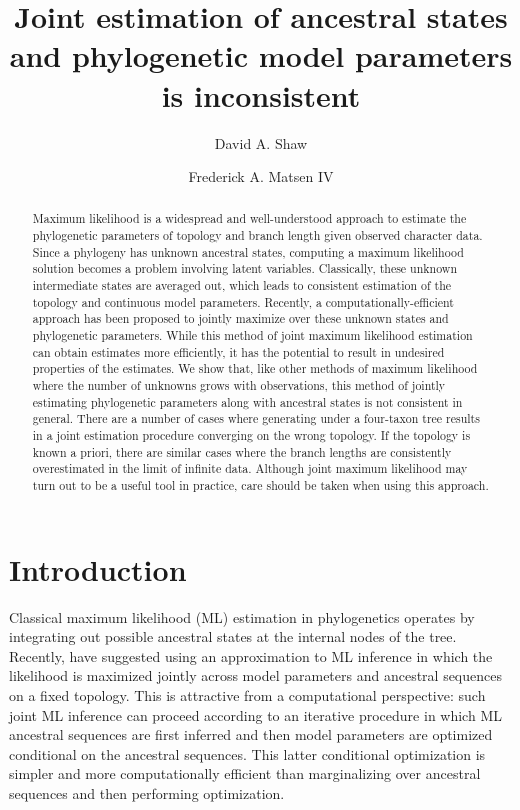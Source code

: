 \documentclass{article}
\title{Joint estimation of ancestral states and phylogenetic model parameters is inconsistent}
\author{David A. Shaw \and Frederick A. Matsen IV}
\begin{document}
\maketitle

\renewcommand{\arraystretch}{1.2} %

\begin{abstract}
Maximum likelihood is a widespread and well-understood approach to estimate the phylogenetic parameters of topology and branch length given observed character data.
Since a phylogeny has unknown ancestral states, computing a maximum likelihood solution becomes a problem involving latent variables.
Classically, these unknown intermediate states are averaged out, which leads to consistent estimation of the topology and continuous model parameters.
Recently, a computationally-efficient approach has been proposed to jointly maximize over these unknown states and phylogenetic parameters.
While this method of joint maximum likelihood estimation can obtain estimates more efficiently, it has the potential to result in undesired properties of the estimates.
We show that, like other methods of maximum likelihood where the number of unknowns grows with observations, this method of jointly estimating phylogenetic parameters along with ancestral states is not consistent in general.
There are a number of cases where generating under a four-taxon tree results in a joint estimation procedure converging on the wrong topology.
If the topology is known a priori, there are similar cases where the branch lengths are consistently overestimated in the limit of infinite data.
Although joint maximum likelihood may turn out to be a useful tool in practice, care should be taken when using this approach.
\end{abstract}

\section*{Introduction}

Classical maximum likelihood (ML) estimation in phylogenetics operates by integrating out possible ancestral states at the internal nodes of the tree.
Recently, \cite{Sagulenko2017-jo} have suggested using an approximation to ML inference in which the likelihood is maximized jointly across model parameters and ancestral sequences on a fixed topology.
This is attractive from a computational perspective: such joint ML inference can proceed according to an iterative procedure in which ML ancestral sequences are first inferred and then model parameters are optimized conditional on the ancestral sequences.
This latter conditional optimization is simpler and more computationally efficient than marginalizing over ancestral sequences and then performing optimization.
\end{document}
